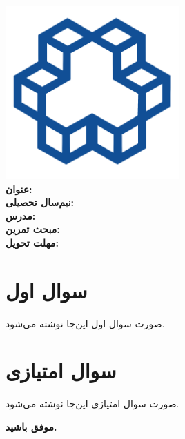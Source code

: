 \documentclass[a4paper,16pt]{article}
\begin{document}
	
	\thispagestyle{empty}
	\begin{center}
		\includegraphics[width=0.5\textwidth]{K._N._Toosi_University_of_Technology.png} \\[10pt] 
		
		\textbf{\LARGE عنوان:}\\[20pt]
		
		\textbf{\LARGE نیم‌سال تحصیلی: }\\[10pt]
		
		\textbf{\Large مدرس: }\\[10pt]
		
		\textbf{\Large مبحث تمرین:  }\\[10pt]
		
		\textbf{\Large مهلت تحویل: }
	\end{center}
	
	\newpage
	
	\tableofcontents
	\newpage
	
	\section{سوال اول}
	صورت سوال اول این‌جا نوشته می‌شود.
	\\
	
	
	\section{سوال امتیازی}
	صورت سوال امتیازی این‌جا نوشته می‌شود.
	
	
	\vspace{10pt}
	\textbf{موفق باشید.}
	
\end{document}
